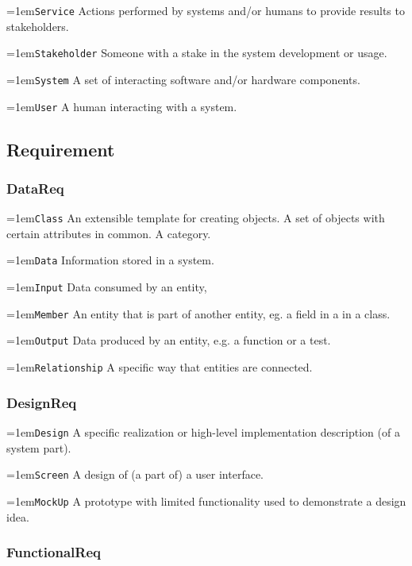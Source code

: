 \documentclass[9pt,a4paper,oneside]{report}
\begin{document}
\begin{multicols*}{4}
\hangindent=1em\lstinline+Service+ Actions performed by systems and/or humans to provide results to stakeholders.

\hangindent=1em\lstinline+Stakeholder+ Someone with a stake in the system development or usage.

\hangindent=1em\lstinline+System+ A set of interacting software and/or hardware components.

\hangindent=1em\lstinline+User+ A human interacting with a system.

\subsection*{Requirement}

\subsubsection*{DataReq}

\hangindent=1em\lstinline+Class+ An extensible template for creating objects. A set of objects with certain attributes in common. A category.

\hangindent=1em\lstinline+Data+ Information stored in a system.

\hangindent=1em\lstinline+Input+ Data consumed by an entity, 

\hangindent=1em\lstinline+Member+ An entity that is part of another entity, eg. a field in a in a class.

\hangindent=1em\lstinline+Output+ Data produced by an entity, e.g. a function or a test.

\hangindent=1em\lstinline+Relationship+ A specific way that entities are connected.

\subsubsection*{DesignReq}

\hangindent=1em\lstinline+Design+ A specific realization or high-level implementation description (of a system part).

\hangindent=1em\lstinline+Screen+ A design of (a part of) a user interface.

\hangindent=1em\lstinline+MockUp+ A prototype with limited functionality used to demonstrate a design idea.

\subsubsection*{FunctionalReq}


\end{multicols*}
\end{document}
